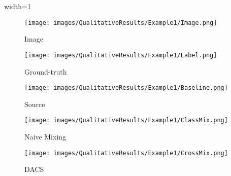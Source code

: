 \documentclass[10pt,twocolumn,letterpaper]{article}
\begin{document}
\begin{figure*}[th!]
    \centering
    \begin{adjustbox}{width=1\textwidth}
    \begin{subfigure}[b]{\textwidth}
        \caption*{\centering \fontsize{40}{60}\selectfont Image}
        \texttt{[image: images/QualitativeResults/Example1/Image.png]}
    \end{subfigure}
    \hspace{0.01cm}
    \begin{subfigure}[b]{\textwidth}
        \caption*{\centering \fontsize{40}{60}\selectfont Ground-truth}
        \texttt{[image: images/QualitativeResults/Example1/Label.png]}
    \end{subfigure}
    \hspace{0.01cm}
    \begin{subfigure}[b]{\textwidth}
        \caption*{\centering \fontsize{40}{60}\selectfont Source}
        \texttt{[image: images/QualitativeResults/Example1/Baseline.png]}
    \end{subfigure}
    \hspace{0.01cm}
    \begin{subfigure}[b]{\textwidth}
        \caption*{\centering \fontsize{40}{60}\selectfont Naive Mixing}
        \texttt{[image: images/QualitativeResults/Example1/ClassMix.png]}
    \end{subfigure}
    \hspace{0.01cm}
    \begin{subfigure}[b]{\textwidth}
        \caption*{\centering \fontsize{40}{60}\selectfont DACS}
        \texttt{[image: images/QualitativeResults/Example1/CrossMix.png]}
    \end{subfigure}
    \end{adjustbox}
    

\end{figure*}
\end{document}
